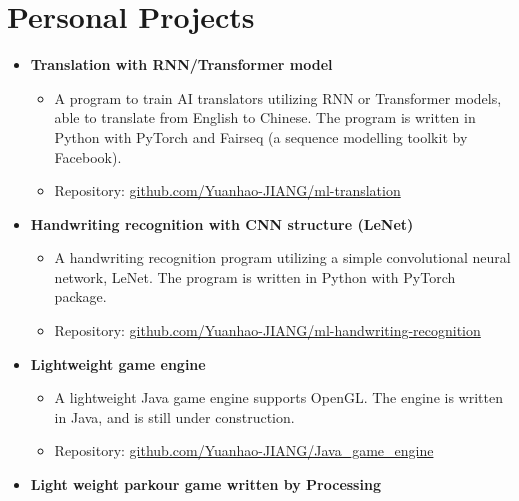 \documentclass[12pt, a4paper]{article}
\newcommand{\resumeSection}[1]{
    \section*{#1}
}
\newcommand{\resumeSectionSubItmII}[1]{\item \textbf{#1}}
\begin{document}
\resumeSection{Personal Projects}
\vspace{1mm}
\begin{itemize}[leftmargin=*]
    \resumeSectionSubItmII{Translation with RNN/Transformer model}
    \vspace{-3mm}
    \begin{itemize}[leftmargin=*]
        \setlength\itemsep{-0.3mm}
        \item A program to train AI translators utilizing RNN or Transformer
            models, able to translate from English to Chinese. The program is
            written in Python with PyTorch and Fairseq (a sequence modelling
            toolkit by Facebook).
        \item Repository: \href{https://github.com/Yuanhao-JIANG/ml-translation}
            {github.com/Yuanhao-JIANG/ml-translation}
    \end{itemize}\vspace{-3.5mm}
    \resumeSectionSubItmII{Handwriting recognition with CNN structure (LeNet)}
    \vspace{-3mm}
    \begin{itemize}[leftmargin=*]
        \setlength\itemsep{-0.3mm}
        \item A handwriting recognition program utilizing a simple convolutional
            neural network, LeNet. The program is written in Python with
            PyTorch package.
        \item Repository:
            \href{https://github.com/Yuanhao-JIANG/ml-handwriting-recognition}
            {github.com/Yuanhao-JIANG/ml-handwriting-recognition}
    \end{itemize}\vspace{-3.5mm}
    \resumeSectionSubItmII{Lightweight game engine}
    \vspace{-3mm}
    \begin{itemize}[leftmargin=*]
        \setlength\itemsep{-0.3mm}
        \item A lightweight Java game engine supports OpenGL. The engine is
            written in Java, and is still under construction.
        \item Repository:
            \href{https://github.com/Yuanhao-JIANG/Java\_game\_engine}
            {github.com/Yuanhao-JIANG/Java\_game\_engine}
    \end{itemize}\vspace{-3.5mm}
    \resumeSectionSubItmII{Light weight parkour game written by Processing}

\end{itemize}
\end{document}
